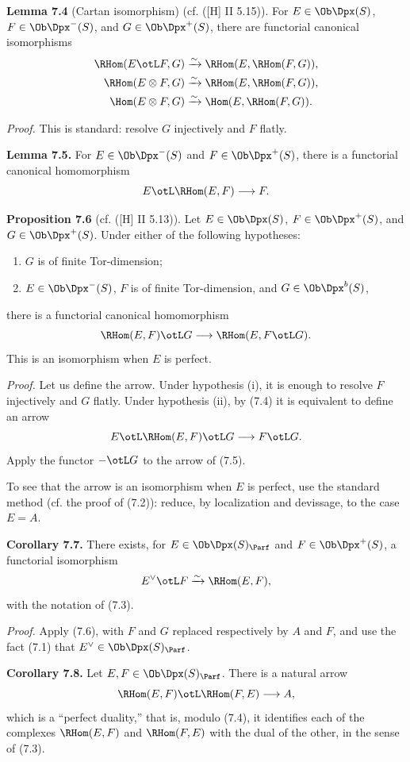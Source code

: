 \textbf{Lemma 7.4} (Cartan isomorphism) (cf. ([H] II 5.15)). For \(E\in\Ob\Dpx(S)\), \(F\in\Ob\Dpx^-(S)\), and \(G\in\Ob\Dpx^+(S)\), there are functorial canonical isomorphisms
\[
\begin{aligned}
\RHom(E\otL F,G)&\xrightarrow{\sim}\RHom(E,\RHom(F,G)),\\
\RHom(E\otimes F,G)&\xrightarrow{\sim}\RHom(E,\RHom(F,G)),\\
\Hom(E\otimes F,G)&\xrightarrow{\sim}\Hom(E,\RHom(F,G)).
\end{aligned}
\]

\emph{Proof.} This is standard: resolve \(G\) injectively and \(F\) flatly.

\textbf{Lemma 7.5.} For \(E\in\Ob\Dpx^-(S)\) and \(F\in\Ob\Dpx^+(S)\), there is a functorial canonical homomorphism
\[
  E\otL \RHom(E,F)\longrightarrow F.
\]

\textbf{Proposition 7.6} (cf. ([H] II 5.13)). Let \(E\in\Ob\Dpx(S)\), \(F\in\Ob\Dpx^+(S)\), and \(G\in\Ob\Dpx^+(S)\). Under either of the following hypotheses:
\begin{enumerate}[label=(\roman*)]
\item \(G\) is of finite Tor-dimension;
\item \(E\in\Ob\Dpx^-(S)\), \(F\) is of finite Tor-dimension, and \(G\in\Ob\Dpx^b(S)\),
\end{enumerate}
there is a functorial canonical homomorphism
\[
  \RHom(E,F)\otL G
  \longrightarrow
  \RHom(E,F\otL G).
\]
This is an isomorphism when \(E\) is perfect.

\emph{Proof.} Let us define the arrow. Under hypothesis (i), it is enough to resolve \(F\) injectively and \(G\) flatly. Under hypothesis (ii), by (7.4) it is equivalent to define an arrow
\[
  E\otL\RHom(E,F)\otL G\longrightarrow F\otL G.
\]
Apply the functor \(-\otL G\) to the arrow of (7.5).

To see that the arrow is an isomorphism when \(E\) is perfect, use the standard method (cf. the proof of (7.2)): reduce, by localization and devissage, to the case \(E=A\).

\textbf{Corollary 7.7.} There exists, for \(E\in\Ob\Dpx(S)_{\Parf}\) and \(F\in\Ob\Dpx^+(S)\), a functorial isomorphism
\[
  E^\vee\otL F\xrightarrow{\sim}\RHom(E,F),
\]
with the notation of (7.3).

\emph{Proof.} Apply (7.6), with \(F\) and \(G\) replaced respectively by \(A\) and \(F\), and use the fact (7.1) that \(E^\vee\in\Ob\Dpx(S)_{\Parf}\).

\textbf{Corollary 7.8.} Let \(E,F\in\Ob\Dpx(S)_{\Parf}\). There is a natural arrow
\[
  \RHom(E,F)\otL \RHom(F,E)\longrightarrow A,
\]
which is a ``perfect duality,'' that is, modulo (7.4), it identifies each of the complexes \(\RHom(E,F)\) and \(\RHom(F,E)\) with the dual of the other, in the sense of (7.3).

